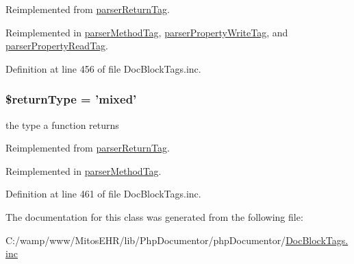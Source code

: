 \-Reimplemented from \hyperlink{classparser_return_tag_a4a925d6b38bcf3957c713a7d3dc7da1f}{parser\-Return\-Tag}.



\-Reimplemented in \hyperlink{classparser_method_tag_a4a925d6b38bcf3957c713a7d3dc7da1f}{parser\-Method\-Tag}, \hyperlink{classparser_property_write_tag_a4a925d6b38bcf3957c713a7d3dc7da1f}{parser\-Property\-Write\-Tag}, and \hyperlink{classparser_property_read_tag_a4a925d6b38bcf3957c713a7d3dc7da1f}{parser\-Property\-Read\-Tag}.



\-Definition at line 456 of file \-Doc\-Block\-Tags.\-inc.

\hypertarget{classparser_property_tag_a0f317c2c1d4c617554890223a39037be}{
\subsubsection[{\$return\-Type}]{\setlength{\rightskip}{0pt plus 5cm}\$return\-Type = 'mixed'}}\label{classparser_property_tag_a0f317c2c1d4c617554890223a39037be}
the type a function returns 

\-Reimplemented from \hyperlink{classparser_return_tag_a0f317c2c1d4c617554890223a39037be}{parser\-Return\-Tag}.



\-Reimplemented in \hyperlink{classparser_method_tag_a0f317c2c1d4c617554890223a39037be}{parser\-Method\-Tag}.



\-Definition at line 461 of file \-Doc\-Block\-Tags.\-inc.



\-The documentation for this class was generated from the following file\-:\begin{DoxyCompactItemize}
\item 
\-C\-:/wamp/www/\-Mitos\-E\-H\-R/lib/\-Php\-Documentor/php\-Documentor/\hyperlink{_doc_block_tags_8inc}{\-Doc\-Block\-Tags.\-inc}\end{DoxyCompactItemize}
